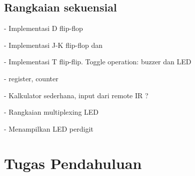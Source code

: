 \documentclass[a4paper,12pt,bahasa]{extarticle}
\begin{document}
\subsection{Rangkaian sekuensial}

- Implementasi D flip-flop

- Implementasi J-K flip-flop dan

- Implementasi T flip-flip. Toggle operation: buzzer dan LED

- register, counter

- Kalkulator sederhana, input dari remote IR ?

- Rangkaian multiplexing LED

- Menampilkan LED perdigit


\section{Tugas Pendahuluan}
\end{document}
